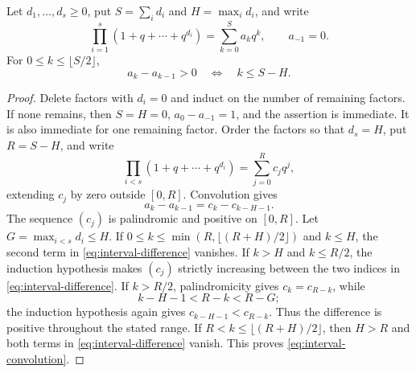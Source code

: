 \documentclass[10pt,a4paper]{amsart}
\begin{document}
\begin{lemma}\label{lem:interval-convolution}
Let $d_1,\ldots,d_s\geq0$, put $S=\sum_i d_i$ and $H=\max_i d_i$, and write
\begin{equation*}
 \prod_{i=1}^{s}(1+q+\cdots+q^{d_i})
 =\sum_{k=0}^{S}a_kq^k,\qquad a_{-1}=0.
\end{equation*}
For $0\leq k\leq\lfloor S/2\rfloor$,
\begin{equation}\label{eq:interval-convolution}
 a_k-a_{k-1}>0\quad\Longleftrightarrow\quad k\leq S-H.
\end{equation}
\end{lemma}

\begin{proof}
Delete factors with $d_i=0$ and induct on the number of remaining factors.
If none remains, then $S=H=0$, $a_0-a_{-1}=1$, and the assertion is
immediate.  It is also immediate for one remaining factor.  Order the
factors so that
$d_s=H$, put $R=S-H$, and write
\begin{equation*}
 \prod_{i<s}(1+q+\cdots+q^{d_i})=\sum_{j=0}^{R}c_jq^j,
\end{equation*}
extending $c_j$ by zero outside $[0,R]$.  Convolution gives
\begin{equation}\label{eq:interval-difference}
 a_k-a_{k-1}=c_k-c_{k-H-1}.
\end{equation}
The sequence $(c_j)$ is palindromic and positive on $[0,R]$.  Let
$G=\max_{i<s}d_i\leq H$.  If
$0\leq k\leq\min(R,\lfloor(R+H)/2\rfloor)$ and $k\leq H$, the second term
in \eqref{eq:interval-difference} vanishes.  If $k>H$ and $k\leq R/2$, the
induction hypothesis makes $(c_j)$ strictly increasing between the two
indices in \eqref{eq:interval-difference}.  If $k>R/2$, palindromicity gives
$c_k=c_{R-k}$, while
\begin{equation*}
 k-H-1<R-k<R-G;
\end{equation*}
the induction hypothesis again gives $c_{k-H-1}<c_{R-k}$.  Thus the
difference is positive throughout the stated range.  If
$R<k\leq\lfloor(R+H)/2\rfloor$, then $H>R$ and both terms in
\eqref{eq:interval-difference} vanish.  This proves
\eqref{eq:interval-convolution}.
\end{proof}
\end{document}

